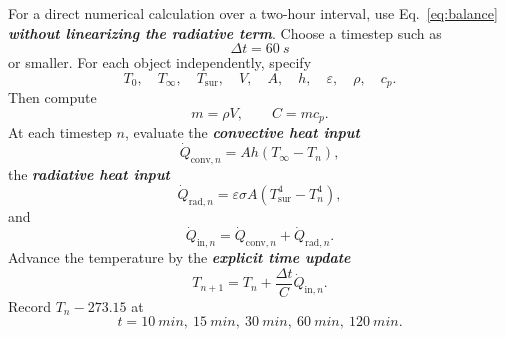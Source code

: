 \documentclass[11pt]{article}
\begin{document}
For a direct numerical calculation over a two-hour interval, use Eq.~\eqref{eq:balance} \textbf{\textit{without linearizing the radiative term}}. Choose a timestep such as
\begin{equation}
    \Delta t = \SI{60}{s}
\end{equation}
or smaller. For each object independently, specify
\begin{equation}
    T_0,\quad T_{\infty},\quad T_{\mathrm{sur}},\quad V,\quad A,\quad h,\quad \varepsilon,\quad \rho,\quad c_p.
\end{equation}
Then compute
\begin{equation}
    m = \rho V, \qquad C = mc_p.
\end{equation}
At each timestep $n$, evaluate the \textbf{\textit{convective heat input}}
\begin{equation}
    \dot Q_{\mathrm{conv},n}=Ah\left(T_{\infty}-T_n\right),
\end{equation}
the \textbf{\textit{radiative heat input}}
\begin{equation}
    \dot Q_{\mathrm{rad},n}=\varepsilon\sigma A\left(T_{\mathrm{sur}}^4-T_n^4\right),
\end{equation}
and
\begin{equation}
    \dot Q_{\mathrm{in},n}
    =\dot Q_{\mathrm{conv},n}+\dot Q_{\mathrm{rad},n}.
\end{equation}
Advance the temperature by the \textbf{\textit{explicit time update}}
\begin{equation}
    T_{n+1}=T_n+\frac{\Delta t}{C}\dot Q_{\mathrm{in},n}.
\end{equation}
Record $T_n-273.15$ at
\begin{equation}
    t=\SI{10}{min},\ \SI{15}{min},\ \SI{30}{min},\ \SI{60}{min},\ \SI{120}{min}.
\end{equation}
\end{document}
